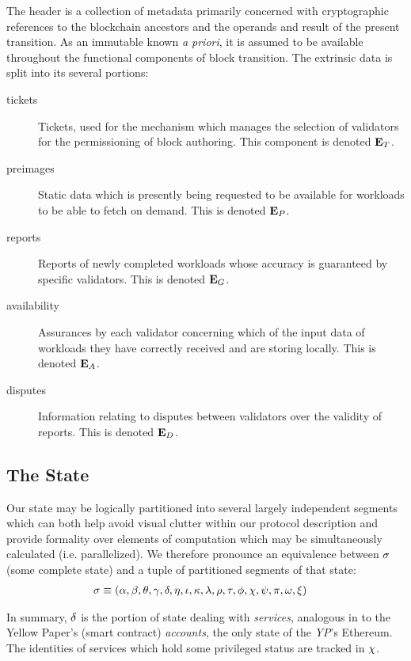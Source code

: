 The header is a collection of metadata primarily concerned with cryptographic references to the blockchain ancestors and the operands and result of the present transition. As an immutable known \emph{a priori}, it is assumed to be available throughout the functional components of block transition. The extrinsic data is split into its several portions:

\begin{description}
  \item[tickets] Tickets, used for the mechanism which manages the selection of validators for the permissioning of block authoring. This component is denoted $\mathbf{E}_T$.
  \item[preimages] Static data which is presently being requested to be available for workloads to be able to fetch on demand. This is denoted $\mathbf{E}_P$.
  \item[reports] Reports of newly completed workloads whose accuracy is guaranteed by specific validators. This is denoted $\mathbf{E}_G$.
  \item[availability] Assurances by each validator concerning which of the input data of workloads they have correctly received and are storing locally. This is denoted $\mathbf{E}_A$.
  \item[disputes] Information relating to disputes between validators over the validity of reports. This is denoted $\mathbf{E}_D$.
\end{description}

\subsection{The State}

Our state may be logically partitioned into several largely independent segments which can both help avoid visual clutter within our protocol description and provide formality over elements of computation which may be simultaneously calculated (i.e. parallelized). We therefore pronounce an equivalence between $\sigma$ (some complete state) and a tuple of partitioned segments of that state:
\begin{align}\label{eq:statecomposition}
  \thestate &\equiv \tup{\authpool, \recent, \lastaccout, \safrole, \accounts, \entropy, \stagingset, \activeset, \previousset, \reports, \thetime, \authqueue, \privileges, \disputes, \activity, \ready, \accumulated}
\end{align}

In summary, $\delta$ is the portion of state dealing with \emph{services}, analogous in \Jam to the Yellow Paper's (smart contract) \emph{accounts}, the only state of the \emph{YP}'s Ethereum. The identities of services which hold some privileged status are tracked in $\chi$.

